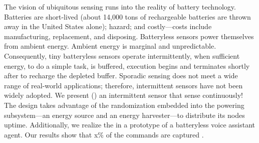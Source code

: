 The vision of ubiquitous sensing runs into the reality of battery technology. Batteries are short-lived (about 14,000 tons of rechargeable batteries are thrown away in the United States alone); hazard; and costly---costs include manufacturing, replacement, and disposing. Batteryless sensors power themselves from ambient energy. Ambient energy is marginal and unpredictable. Consequently, tiny batteryless sensors operate intermittently, when sufficient energy, to do a simple task, is buffered, execution begins and terminates shortly after to recharge the depleted buffer. Sporadic sensing does not meet a wide range of real-world applications; therefore, intermittent sensors have not been widely adopted. We present \textit{\fullsys} (\sys) an intermittent sensor that sense continuously! The \sys design takes advantage of the randomization embedded into the powering subsystem---an energy source and an energy harvester---to distribute its nodes uptime. Additionally, we realize the \sys in a prototype of a batteryless voice assistant agent. Our results show that x\% of the commands are captured .
%
%
%
%
